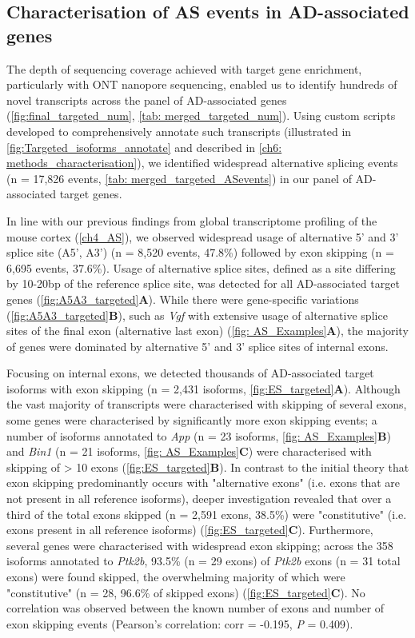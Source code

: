 \clearpage

\subsection{Characterisation of AS events in AD-associated genes}
The depth of sequencing coverage achieved with target gene enrichment, particularly with ONT nanopore sequencing, enabled us to identify hundreds of novel transcripts across the panel of AD-associated genes (\cref{fig:final_targeted_num}, \cref{tab: merged_targeted_num}). Using custom scripts developed to comprehensively annotate such transcripts (illustrated in \cref{fig:Targeted_isoforms_annotate} and described in \cref{ch6: methods_characterisation}), we identified widespread alternative splicing events (n = 17,826 events, \cref{tab: merged_targeted_ASevents}) in our panel of AD-associated target genes.

In line with our previous findings from global transcriptome profiling of the mouse cortex (\cref{ch4_AS}), we observed widespread usage of alternative 5' and 3' splice site (A5', A3') (n = 8,520 events, 47.8\%) followed by exon skipping (n = 6,695 events, 37.6\%). Usage of alternative splice sites, defined as a site differing by 10-20bp of the reference splice site, was detected for all AD-associated target genes (\cref{fig:A5A3_targeted}\textbf{A}). While there were gene-specific variations (\cref{fig:A5A3_targeted}\textbf{B}), such as \textit{Vgf} with extensive usage of alternative splice sites of the final exon (alternative last exon) (\cref{fig: AS_Examples}\textbf{A}), the majority of genes were dominated by alternative 5' and 3' splice sites of internal exons.

Focusing on internal exons, we detected thousands of AD-associated target isoforms with exon skipping (n = 2,431 isoforms, \cref{fig:ES_targeted}\textbf{A}). Although the vast majority of transcripts were characterised with skipping of several exons, some genes were characterised by significantly more exon skipping events; a number of isoforms annotated to \textit{App} (n = 23 isoforms, \cref{fig: AS_Examples}\textbf{B}) and \textit{Bin1} (n = 21 isoforms, \cref{fig: AS_Examples}\textbf{C}) were characterised with skipping of > 10 exons (\cref{fig:ES_targeted}\textbf{B}). In contrast to the initial theory that exon skipping predominantly occurs with "alternative exons" (i.e. exons that are not present in all reference isoforms), deeper investigation revealed that over a third of the total exons skipped (n = 2,591 exons, 38.5\%) were "constitutive" (i.e. exons present in all reference isoforms) (\cref{fig:ES_targeted}\textbf{C}). Furthermore, several genes were characterised with widespread exon skipping; across the 358 isoforms annotated to \textit{Ptk2b}, 93.5\% (n = 29 exons)  of \textit{Ptk2b} exons (n = 31 total exons) were found skipped, the overwhelming majority of which were "constitutive" (n = 28, 96.6\% of skipped exons) (\cref{fig:ES_targeted}\textbf{C}). No correlation was observed between the known number of exons and number of exon skipping events (Pearson's correlation: corr = -0.195, \textit{P} = 0.409). 

